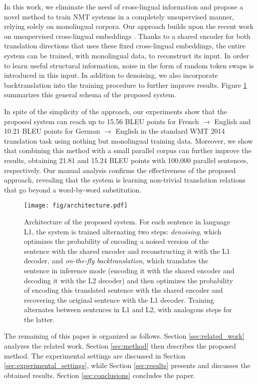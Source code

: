 \documentclass{article} \usepackage{iclr2018_conference,times}
\begin{document}
In this work, we eliminate the need of cross-lingual information and propose a novel method to train NMT systems in a completely unsupervised manner, relying solely on monolingual corpora. Our approach builds upon the recent work on unsupervised cross-lingual embeddings \citep{artetxe2017learning,zhang2017adversarial}. Thanks to a shared encoder for both translation directions that uses these fixed cross-lingual embeddings, the entire system can be trained, with monolingual data, to reconstruct its input. In order to learn useful structural information, noise in the form of random token swaps is introduced in this input. In addition to denoising, we also incorporate backtranslation \citep{sennrich2016improving} into the training procedure to further improve results. Figure \ref{fig:architecture} summarizes this general schema of the proposed system.

In spite of the simplicity of the approach, our experiments show that the proposed system can reach up to 15.56 BLEU points for French $\rightarrow$ English and 10.21 BLEU points for German $\rightarrow$ English in the standard WMT 2014 translation task using nothing but monolingual training data. Moreover, we show that combining this method with a small parallel corpus
can further improve the results, obtaining 21.81 and 15.24 BLEU points with 100,000 parallel sentences, respectively. Our manual analysis confirms the effectiveness of the proposed approach, revealing that the system is learning non-trivial translation relations that go beyond a word-by-word substitution.

\begin{figure}[t] \centering
\texttt{[image: fig/architecture.pdf]}
\caption{Architecture of the proposed system. For each sentence in language L1, the system is trained alternating two steps: \textit{denoising}, which optimizes the probability of encoding a noised version of the sentence with the shared encoder and reconstructing it with the L1 decoder, and \textit{on-the-fly backtranslation}, which translates the sentence in inference mode (encoding it with the shared encoder and decoding it with the L2 decoder) and then optimizes the probability of encoding this translated sentence with the shared encoder and recovering the original sentence with the L1 decoder. Training alternates between sentences in L1 and L2, with analogous steps for the latter.}
\label{fig:architecture}
\end{figure}

The remaining of this paper is organized as follows. Section \ref{sec:related_work} analyzes the related work. Section \ref{sec:method} then describes the proposed method. The experimental settings are discussed in Section \ref{sec:experimental_settings}, while Section \ref{sec:results} presents and discusses the obtained results. Section \ref{sec:conclusions} concludes the paper.
\end{document}
